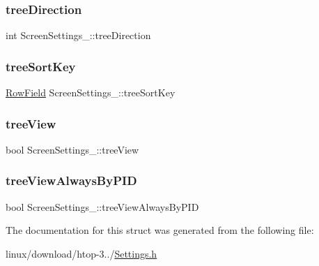 \subsubsection{\texorpdfstring{tree\+Direction}{treeDirection}}
{\footnotesize\ttfamily int Screen\+Settings\+\_\+\+::tree\+Direction}

\mbox{\label{structScreenSettings___ab7fc4d25dbff4372340d14ceda7e4cdb}} 
\subsubsection{\texorpdfstring{tree\+Sort\+Key}{treeSortKey}}
{\footnotesize\ttfamily \hyperlink{RowField_8h_a7a6f9b44bcdc803955266dc3e8fe58cb}{Row\+Field} Screen\+Settings\+\_\+\+::tree\+Sort\+Key}

\mbox{\label{structScreenSettings___adaff8a1713d8c801ecd6d0011ab0961c}} 
\subsubsection{\texorpdfstring{tree\+View}{treeView}}
{\footnotesize\ttfamily bool Screen\+Settings\+\_\+\+::tree\+View}

\mbox{\label{structScreenSettings___af291d260b3d35edeb9dddd2a824a49f6}} 
\subsubsection{\texorpdfstring{tree\+View\+Always\+By\+P\+ID}{treeViewAlwaysByPID}}
{\footnotesize\ttfamily bool Screen\+Settings\+\_\+\+::tree\+View\+Always\+By\+P\+ID}



The documentation for this struct was generated from the following file\+:\begin{DoxyCompactItemize}
\item 
linux/download/htop-\/3../\hyperlink{Settings_8h}{Settings.\+h}\end{DoxyCompactItemize}
